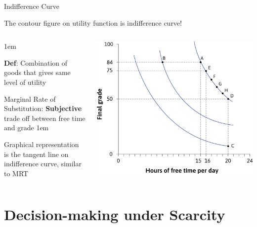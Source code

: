 \documentclass[11pt,aspectratio=43,usenames,dvipsnames]{beamer}
\let\olditemize=\itemize
\let\endolditemize=\enditemize
\renewenvironment{itemize}{\olditemize \itemsep1em}{\endolditemize}
\theoremstyle{definition}
\begin{document}
\begin{frame}{Indifference Curve}
\label{slide:Indifference_Curve}

The contour figure on utility function is indifference curve!

\begin{columns}
    \begin{column}{0.4\textwidth}
        \begin{itemize}
            \item \textbf{Def}: Combination of goods that gives \alert{same level} of utility
            \item M{\tiny arginal }R{\tiny ate of }S{\tiny ubstitution}: \textbf{Subjective} trade off between free time and grade
            \begin{itemize}
                \item Graphical representation is the tangent line on indifference curve, similar to MRT
            \end{itemize}
        \end{itemize}
    \end{column}
    \begin{column}{0.6\textwidth}
        \includegraphics[width=\textwidth]{./figures/IndiffCurve.png}
    \end{column}
\end{columns}

\end{frame}

\section[Decision]{Decision-making under Scarcity}
\label{sec:Decision_making_under_Scarcity}
\end{document}
